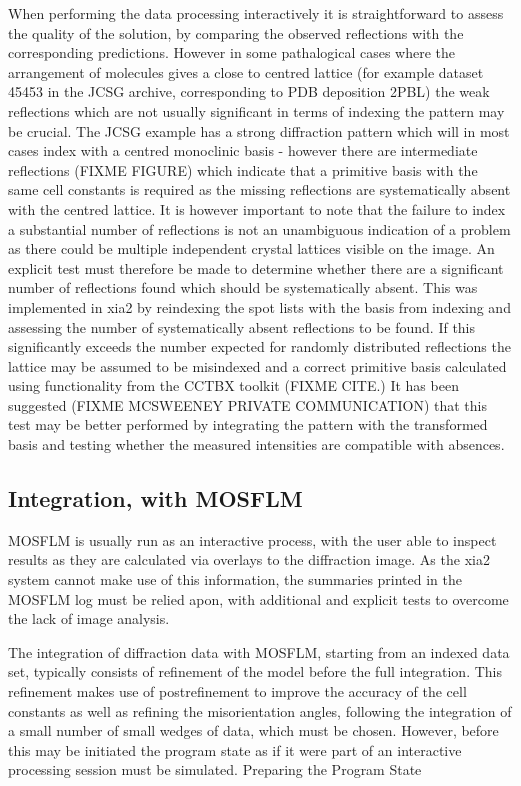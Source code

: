 \documentclass[a4paper, 11pt]{article}
\begin{document}
When performing the data processing interactively it is straightforward to assess the quality of the solution, by comparing the observed reflections with the corresponding predictions. However in some pathalogical cases where the arrangement of molecules gives a close to centred lattice (for example dataset 45453 in the JCSG archive, corresponding to PDB deposition 2PBL) the weak reflections which are not usually significant in terms of indexing the pattern may be crucial. The JCSG example has a strong diffraction pattern which will in most cases index with a centred monoclinic basis - however there are intermediate reflections (FIXME FIGURE) which indicate that a primitive basis with the same cell constants is required as the missing reflections are systematically absent with the centred lattice. It is however important to note that the failure to index a substantial number of reflections is not an unambiguous indication of a problem as there could be multiple independent crystal lattices visible on the image. An explicit test must therefore be made to determine whether there are a significant number of reflections found which should be systematically absent. This was implemented in xia2 by reindexing the spot lists with the basis from indexing and assessing the number of systematically absent reflections to be found. If this significantly exceeds the number expected for randomly distributed reflections the lattice may be assumed to be misindexed and a correct primitive basis calculated using functionality from the CCTBX toolkit (FIXME CITE.) It has been suggested (FIXME MCSWEENEY PRIVATE COMMUNICATION) that this test may be better performed by integrating the pattern with the transformed basis and testing whether the measured intensities are compatible with absences.

\subsection{Integration, with MOSFLM}

MOSFLM is usually run as an interactive process, with the user able to inspect results as they are calculated via overlays to the diffraction image. As the xia2 system cannot make use of this information, the summaries printed in the MOSFLM log must be relied apon, with additional and explicit tests to overcome the lack of image analysis.

The integration of diffraction data with MOSFLM, starting from an indexed data set, typically consists of refinement of the model before the full integration. This refinement makes use of postrefinement to improve the accuracy of the cell constants as well as refining the misorientation angles, following the integration of a small number of small wedges of data, which must be chosen. However, before this may be initiated the program state as if it were part of an interactive processing session must be simulated.
Preparing the Program State
\end{document}
